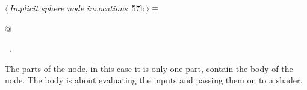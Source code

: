 \documentclass[
    a4paper,      %
    10pt,         %
    openright,    %
    notitlepage,  %
    parskip=half, %
]{scrreprt}       %
\theoremstyle{definition}                    %
\begin{document}
\begin{flushleft} \small
\begin{minipage}{\linewidth}\label{scrap94}\raggedright\small
{} $\langle\,${\itshape Implicit sphere node invocations}\nobreak\ {\footnotesize {57b}}$\,\rangle\equiv$
\vspace{-1ex}
\begin{list}{}{} \item
\mbox{}@{\NWsep}
\end{list}
\vspace{-1.5ex}
\footnotesize
\begin{list}{}{\setlength{\itemsep}{-\parsep}\setlength{\itemindent}{-\leftmargin}}
\item \NWtxtMacroRefIn\ .

\item{}
\end{list}
\end{minipage}\vspace{4ex}
\end{flushleft}
The parts of the node, in this case it is only one part, contain the body of
the node. The body is about evaluating the inputs and passing them on to a
shader.
\end{document}
